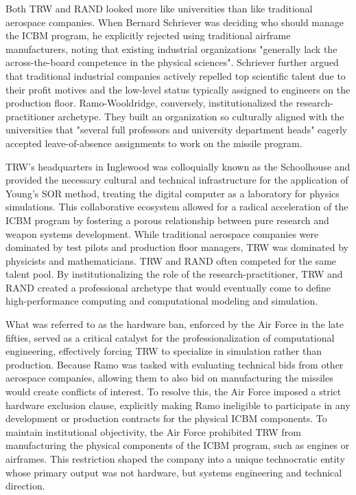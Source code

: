 Both TRW and RAND looked more like universities than like traditional aerospace companies. When Bernard Schriever was deciding who should manage the ICBM program, he explicitly rejected using traditional airframe manufacturers, noting that existing industrial organizations "generally lack the across-the-board competence in the physical sciences". Schriever further argued that traditional industrial companies actively repelled top scientific talent due to their profit motives and the low-level status typically assigned to engineers on the production floor. Ramo-Wooldridge, conversely, institutionalized the research-practitioner archetype. They built an organization so culturally aligned with the universities that "several full professors and university department heads" eagerly accepted leave-of-absence assignments to work on the missile program. 

TRW’s headquarters in Inglewood was colloquially known as the Schoolhouse and provided the necessary cultural and technical infrastructure for the application of Young’s SOR method, treating the digital computer as a laboratory for physics simulations. This collaborative ecosystem allowed for a radical acceleration of the ICBM program by fostering a porous relationship between pure research and weapon systems development. While traditional aerospace companies were dominated by test pilots and production floor managers, TRW was dominated by physicists and mathematicians. TRW and RAND often competed for the same talent pool. By institutionalizing the role of the research-practitioner, TRW and RAND created a professional archetype that would eventually come to define high-performance computing and computational modeling and simulation. 

What was referred to as the hardware ban, enforced by the Air Force in the late fifties, served as a critical catalyst for the professionalization of computational engineering, effectively forcing TRW to specialize in simulation rather than production. Because Ramo was tasked with evaluating technical bids from other aerospace companies, allowing them to also bid on manufacturing the missiles would create conflicts of interest. To resolve this, the Air Force imposed a strict hardware exclusion clause, explicitly making Ramo ineligible to participate in any development or production contracts for the physical ICBM components. To maintain institutional objectivity, the Air Force prohibited TRW from manufacturing the physical components of the ICBM program, such as engines or airframes. This restriction shaped the company into a unique technocratic entity whose primary output was not hardware, but systems engineering and technical direction. 

